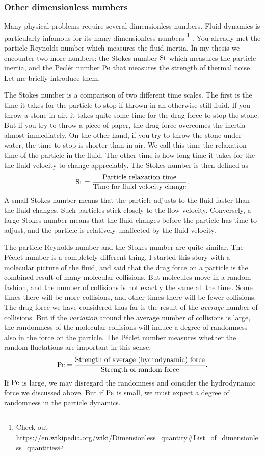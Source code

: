 \documentclass[thesis.tex]{subfiles}
\begin{document}
\subsubsection*{Other dimensionless numbers}

Many physical problems require several dimensionless numbers. Fluid dynamics is particularly infamous for its many dimensionless numbers%
\footnote{Check out \url{https://en.wikipedia.org/wiki/Dimensionless_quantity\#List_of_dimensionless_quantities}}%
. You already met the particle Reynolds number which measures the fluid inertia. In my thesis we encounter two more numbers: the Stokes number $\mbox{St}$ which measures the particle inertia, and the Pecl\'et number $\mbox{Pe}$ that measures the strength of thermal noise. Let me briefly introduce them.

The Stokes number is a comparison of two different time scales. The first is the time it takes for the particle to stop if thrown in an otherwise still fluid. If you throw a stone in air, it takes quite some time for the drag force to stop the stone. But if you try to throw a piece of paper, the drag force overcomes the inertia almost immediately. On the other hand, if you try to throw the stone under water, the time to stop is shorter than in air. We call this time the relaxation time of the particle in the fluid. 
The other time is how long time it takes for the the fluid velocity to change appreciably. The Stokes number is then defined as
\begin{align*}
    \mbox{St} = \frac{\textrm{Particle relaxation time}}{\textrm{Time for fluid velocity change}}.
 \end{align*} 
A small Stokes number means that the particle adjusts to the fluid faster than the fluid changes. Such particles stick closely to the flow velocity. Conversely, a large Stokes number means that the fluid changes before the particle has time to adjust, and the particle is relatively unaffected by the fluid velocity. 

The particle Reynolds number and the Stokes number are quite similar. The P\'eclet number is a completely different thing. I started this story with a molecular picture of the fluid, and said that the drag force on a particle is the combined result of many molecular collisions. But molecules move in a random fashion, and the number of collisions is not exactly the same all the time. Some times there will be more collisions, and other times there will be fewer collisions. The drag force we have considered thus far is the result of the \emph{average} number of collisions. But if the \emph{variation} around the average number of collisions is large, the randomness of the molecular collisions will induce a degree of randomness also in the force on the particle. The P\'eclet number measures whether the random fluctations are important in this sense:
\begin{align*}
    \mbox{Pe} = \frac{\textrm{Strength of average (hydrodynamic) force}}{\textrm{Strength of random force}}.
\end{align*}
If $\mbox{Pe}$ is large, we may disregard the randomness and consider the hydrodynamic force we discussed above. But if $\mbox{Pe}$ is small, we must expect a degree of randomness in the particle dynamics.
\end{document}
